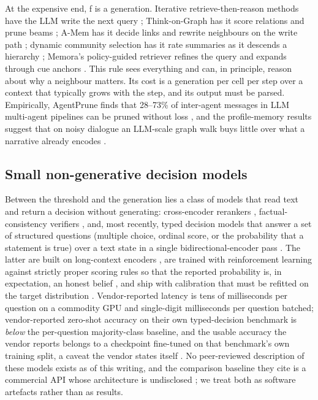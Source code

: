 \documentclass[11pt]{article}
\begin{document}
At the expensive end, f is a generation. Iterative retrieve-then-reason methods have the LLM write the next query \cite{ircot,selfask}; Think-on-Graph has it score relations and prune beams \cite{tog}; A-Mem has it decide links and rewrite neighbours on the write path \cite{amem}; dynamic community selection has it rate summaries as it descends a hierarchy \cite{graphrag-dynamic}; Memora's policy-guided retriever refines the query and expands through cue anchors \cite{memora}. This rule sees everything and can, in principle, reason about why a neighbour matters. Its cost is a generation per cell per step over a context that typically grows with the step, and its output must be parsed. Empirically, AgentPrune finds that 28--73\% of inter-agent messages in LLM multi-agent pipelines can be pruned without loss \cite{agentprune}, and the profile-memory results suggest that on noisy dialogue an LLM-scale graph walk buys little over what a narrative already encodes \cite{prograph}.

\subsection{Small non-generative decision models}

Between the threshold and the generation lies a class of models that read text and return a decision without generating: cross-encoder rerankers \cite{monobert,colbert}, factual-consistency verifiers \cite{alignscore,minicheck}, and, most recently, typed decision models that answer a set of structured questions (multiple choice, ordinal score, or the probability that a statement is true) over a text state in a single bidirectional-encoder pass \cite{laya,jev}. The latter are built on long-context encoders \cite{modernbert,mmbert}, are trained with reinforcement learning against strictly proper scoring rules so that the reported probability is, in expectation, an honest belief \cite{gneiting2007}, and ship with calibration that must be refitted on the target distribution \cite{guo2017}. Vendor-reported latency is tens of milliseconds per question on a commodity GPU and single-digit milliseconds per question batched; vendor-reported zero-shot accuracy on their own typed-decision benchmark is \emph{below} the per-question majority-class baseline, and the usable accuracy the vendor reports belongs to a checkpoint fine-tuned on that benchmark's own training split, a caveat the vendor states itself \cite{laya}. No peer-reviewed description of these models exists as of this writing, and the comparison baseline they cite is a commercial API whose architecture is undisclosed \cite{jev}; we treat both as software artefacts rather than as results.
\end{document}
